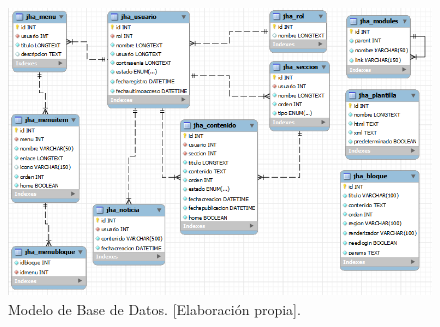 \begin{figure}[h]
\centering
\includegraphics[scale=.6, keepaspectratio=true]{imagenes/12_imagen.png}
\caption{Modelo de Base de Datos. [Elaboraci\'on propia].}
\end{figure}

\clearpage
